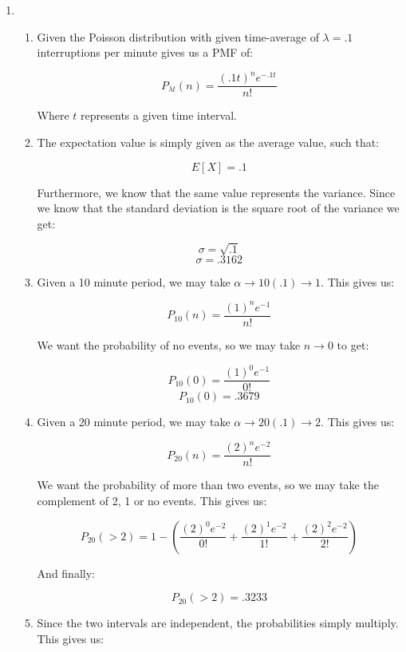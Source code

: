 \begin{enumerate}

  \item 

    \begin{enumerate}

      \item Given the Poisson distribution with given time-average of $\lambda=.1$ interruptions per minute gives us a PMF of:

        $$\boxed{P_{\lambda t}(n)=\frac{(.1t)^ne^{-.1t}}{n!}}$$

        Where $t$ represents a given time interval.

      \item The expectation value is simply given as the average value, such that:

        $$\boxed{E[X]=.1}$$

        Furthermore, we know that the same value represents the variance. Since we know that the standard deviation is the square root of the variance we get:

        $$\sigma=\sqrt{.1}$$
        $$\boxed{\sigma=.3162}$$

      \item Given a 10 minute period, we may take $\alpha\to 10(.1)\to 1$. This gives us:

        $$P_{10}(n)=\frac{(1)^ne^{-1}}{n!}$$

        We want the probability of no events, so we may take $n\to 0$ to get:

        $$P_{10}(0)=\frac{(1)^0e^{-1}}{0!}$$
        $$\boxed{P_{10}(0)=.3679}$$

      \item Given a 20 minute period, we may take $\alpha\to 20(.1)\to 2$. This gives us:

        $$P_{20}(n)=\frac{(2)^ne^{-2}}{n!}$$

        We want the probability of more than two events, so we may take the complement of 2, 1 or no events. This gives us:

        $$P_{20}(>2)=1-\left(\frac{(2)^0e^{-2}}{0!}+\frac{(2)^1e^{-2}}{1!}+\frac{(2)^2e^{-2}}{2!}\right)$$

        And finally:

        $$\boxed{P_{20}(>2)=.3233}$$

      \item Since the two intervals are independent, the probabilities simply multiply. This gives us:


\end{enumerate}
\end{enumerate}
